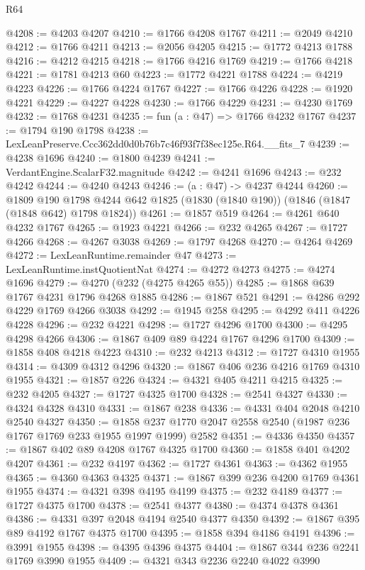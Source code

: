 \begin{lexlean}{R64}
\begin{coremodule}
@4208 := @4203 @4207
@4210 := @1766 @4208 @1767
@4211 := @2049 @4210
@4212 := @1766 @4211
@4213 := @2056 @4205
@4215 := @1772 @4213 @1788
@4216 := @4212 @4215
@4218 := @1766 @4216 @1769
@4219 := @1766 @4218
@4221 := @1781 @4213 @60
@4223 := @1772 @4221 @1788
@4224 := @4219 @4223
@4226 := @1766 @4224 @1767
@4227 := @1766 @4226
@4228 := @1920 @4221
@4229 := @4227 @4228
@4230 := @1766 @4229
@4231 := @4230 @1769
@4232 := @1768 @4231
@4235 := fun (a : @47) => @1766 @4232 @1767
@4237 := @1794 @190 @1798
@4238 := LexLeanPreserve.Ccc362dd0d0b76b7c46f93f7f38ec125e.R64.__fits_7
@4239 := @4238 @1696
@4240 := @1800 @4239
@4241 := VerdantEngine.ScalarF32.magnitude
@4242 := @4241 @1696
@4243 := @232 @4242
@4244 := @4240 @4243
@4246 := (a : @47) -> @4237 @4244
@4260 := @1809
    @190
    @1798
    @4244
    @642
    @1825
    (@1830 (@1840 @190))
    (@1846 (@1847 (@1848 @642) @1798 @1824))
@4261 := @1857 @519
@4264 := @4261 @640 @4232 @1767
@4265 := @1923 @4221
@4266 := @232 @4265
@4267 := @1727 @4266
@4268 := @4267 @3038
@4269 := @1797 @4268
@4270 := @4264 @4269
@4272 := LexLeanRuntime.remainder @47
@4273 := LexLeanRuntime.instQuotientNat
@4274 := @4272 @4273
@4275 := @4274 @1696
@4279 := @4270 (@232 (@4275 @4265 @55))
@4285 := @1868 @639 @1767 @4231 @1796 @4268 @1885
@4286 := @1867 @521
@4291 := @4286 @292 @4229 @1769 @4266 @3038
@4292 := @1945 @258
@4295 := @4292 @411 @4226 @4228
@4296 := @232 @4221
@4298 := @1727 @4296 @1700
@4300 := @4295 @4298 @4266
@4306 := @1867 @409 @89 @4224 @1767 @4296 @1700
@4309 := @1858 @408 @4218 @4223
@4310 := @232 @4213
@4312 := @1727 @4310 @1955
@4314 := @4309 @4312 @4296
@4320 := @1867 @406 @236 @4216 @1769 @4310 @1955
@4321 := @1857 @226
@4324 := @4321 @405 @4211 @4215
@4325 := @232 @4205
@4327 := @1727 @4325 @1700
@4328 := @2541 @4327
@4330 := @4324 @4328 @4310
@4331 := @1867 @238
@4336 := @4331 @404 @2048 @4210 @2540 @4327
@4350 := @1858 @237 @1770 @2047 @2558 @2540 (@1987 @236 @1767 @1769 @233 @1955 @1997 @1999) @2582
@4351 := @4336 @4350
@4357 := @1867 @402 @89 @4208 @1767 @4325 @1700
@4360 := @1858 @401 @4202 @4207
@4361 := @232 @4197
@4362 := @1727 @4361
@4363 := @4362 @1955
@4365 := @4360 @4363 @4325
@4371 := @1867 @399 @236 @4200 @1769 @4361 @1955
@4374 := @4321 @398 @4195 @4199
@4375 := @232 @4189
@4377 := @1727 @4375 @1700
@4378 := @2541 @4377
@4380 := @4374 @4378 @4361
@4386 := @4331 @397 @2048 @4194 @2540 @4377 @4350
@4392 := @1867 @395 @89 @4192 @1767 @4375 @1700
@4395 := @1858 @394 @4186 @4191
@4396 := @3991 @1955
@4398 := @4395 @4396 @4375
@4404 := @1867 @344 @236 @2241 @1769 @3990 @1955
@4409 := @4321 @343 @2236 @2240 @4022 @3990

\end{coremodule}
\end{lexlean}
